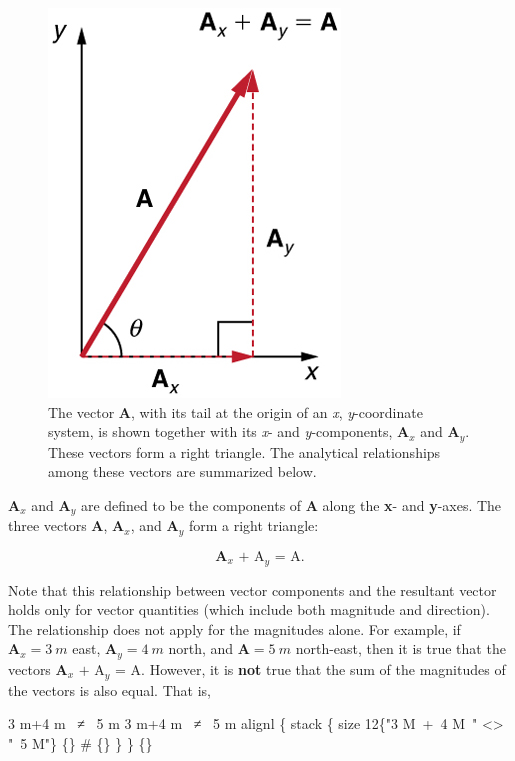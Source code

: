 \documentclass[
]{book}
\begin{document}
\begin{figure}
\hypertarget{import-auto-id1165298677803}{%
\centering
\includegraphics{images/Figure_03_03_01a.jpg}
\caption{The vector \(\mathbf{A}{}\), with its tail at the origin of an \emph{x},
\emph{y}-coordinate system, is shown together with its \emph{x}- and
\emph{y}-components, \(\mathbf{A}_{x}{}\) and \(\mathbf{A}_{y}{}\). These vectors
form a right triangle. The analytical relationships among these vectors
are summarized
below.}\label{import-auto-id1165298677803}
}
\end{figure}

\(\mathbf{A}_{x}{}\) and \(\mathbf{A}_{y}{}\) are defined to be the
components of \emph{}\(\mathbf{A}{}\) along the
\textbf{x}- and \textbf{y}-axes. The three vectors \(\mathbf{A}{}\),
\(\mathbf{A}_{x}{}\), and \(\mathbf{A}_{y}{}\) form a right triangle:

\leavevmode{}%
\[{{\mathbf{A}_{x}\text{~+~A}_{y}\text{~=~A}}\text{.}}{}\]

Note that this relationship between vector components and the resultant
vector holds only for vector quantities (which include both magnitude
and direction). The relationship does not apply for the magnitudes
alone. For example, if \({\textbf{A}_{x} = 3\ m}{}\) east,
\({\textbf{A}_{y} = 4\ m}{}\) north, and \({\textbf{A} = 5\ m}{}\)
north-east, then it is true that the vectors
\({\mathbf{A}_{x}\text{~+~A}_{y}\text{~=~A}}{}\). However, it is \textbf{not}
true that the sum of the magnitudes of the vectors is also equal. That
is,

\leavevmode{}%
{3 m+4 m~ ≠ ~5 m 3 m+4 m~ ≠ ~5 m alignl \{ stack \{ size 12\{"3 M~+~4
M~" \textless\textgreater{} "~5 M"\} \{\} \# \{\} \} \} \{\}}
\end{document}

